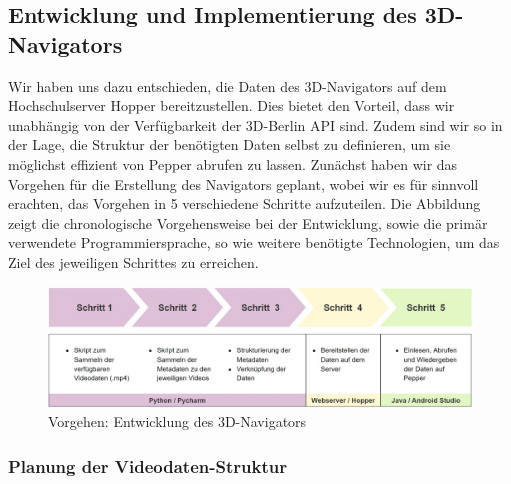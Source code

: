 \subsection{Entwicklung und Implementierung des 3D-Navigators}

Wir haben uns dazu entschieden, die Daten des 3D-Navigators auf dem Hochschulserver Hopper bereitzustellen. Dies bietet den Vorteil, dass wir unabhängig von der Verfügbarkeit der 3D-Berlin API sind. Zudem sind wir so in der Lage, die Struktur der benötigten Daten selbst zu definieren, um sie möglichst effizient von Pepper abrufen zu lassen. Zunächst haben wir das Vorgehen für die Erstellung des Navigators geplant, wobei wir es für sinnvoll erachten, das Vorgehen in 5 verschiedene Schritte aufzuteilen. Die Abbildung zeigt die chronologische Vorgehensweise bei der Entwicklung, sowie die primär verwendete Programmiersprache, so wie weitere benötigte Technologien, um das Ziel des jeweiligen Schrittes zu erreichen.\\

\begin{figure}[H]
    \includegraphics[width=\textwidth]{Figures/3DNavigator/Implementierungdes3DNavigators.jpg}
    \caption{Vorgehen: Entwicklung des 3D-Navigators}
    \label{fig:dev-navigator}
    \centering
\end{figure}

\subsubsection{Planung der Videodaten-Struktur}

